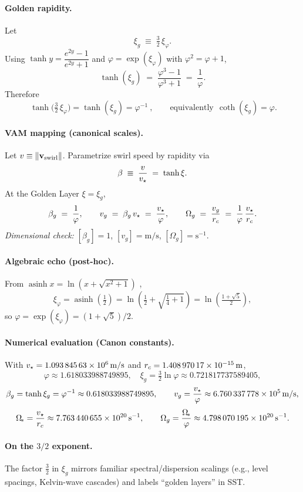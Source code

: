\paragraph*{Golden rapidity.}
Let
\[
	\xi_g \;\equiv\; \tfrac{3}{2}\,\xi_\varphi.
\]
Using \(\tanh y=\dfrac{e^{2y}-1}{e^{2y}+1}\) \cite{NISTDLMF} and \(\varphi=\exp(\xi_\varphi)\) with \(\varphi^2=\varphi+1\),
\[
	\tanh(\xi_g) \;=\; \frac{\varphi^3-1}{\varphi^3+1}
	\;=\; \frac{1}{\varphi}.
\]
Therefore
\[
	\boxed{\ \tanh\!\big(\tfrac{3}{2}\,\xi_\varphi\big)=\tanh(\xi_g)=\varphi^{-1}\ },
	\qquad\text{equivalently}\ \ \coth(\xi_g)=\varphi.
\]

\paragraph*{VAM mapping (canonical scales).}
Let \(v\equiv\|\mathbf{v}_{\mathrm{swirl}}\|\). Parametrize swirl speed by rapidity via
\[
	\beta \;\equiv\; \frac{v}{v_\star} \;=\; \tanh\xi.
\]
At the Golden Layer \(\xi=\xi_g\),
\[
	\beta_g \;=\; \frac{1}{\varphi},\qquad
	v_g \;=\; \beta_g\,v_\star \;=\; \frac{v_\star}{\varphi},\qquad
	\Omega_g \;=\; \frac{v_g}{r_c} \;=\; \frac{1}{\varphi}\,\frac{v_\star}{r_c}.
\]
\emph{Dimensional check:} \([\beta_g]=1\), \([v_g]=\mathrm{m/s}\), \([\Omega_g]=\mathrm{s}^{-1}\).

\paragraph*{Algebraic echo (post-hoc).}
From \(\operatorname{asinh}x=\ln(x+\sqrt{x^2+1})\) \cite{NISTDLMF},
\[
	\xi_\varphi=\operatorname{asinh}\!\left(\tfrac{1}{2}\right)
	=\ln\!\left(\tfrac{1}{2}+\sqrt{\tfrac{1}{4}+1}\right)
	=\ln\!\left(\tfrac{1+\sqrt5}{2}\right),
\]
so \(\varphi=\exp(\xi_\varphi)=(1+\sqrt5)/2\).

\paragraph*{Numerical evaluation (Canon constants).}
With \(v_\star=\SI{1.09384563e6}{m/s}\) and \(r_c=\SI{1.40897017e-15}{m}\),
\[
	\varphi \approx 1.618033988749895,\quad
	\xi_g=\tfrac{3}{2}\ln\varphi \approx 0.721817737589405,
\]
\[
	\beta_g=\tanh\xi_g=\varphi^{-1}\approx 0.618033988749895,\qquad
	v_g=\frac{v_\star}{\varphi}\approx \SI{6.760337778e5}{m/s},
\]
\[
	\Omega_{\!*}=\frac{v_\star}{r_c}\approx \SI{7.763440655e20}{s^{-1}},\qquad
	\Omega_g=\frac{\Omega_{\!*}}{\varphi}\approx \SI{4.798070195e20}{s^{-1}}.
\]

\paragraph*{On the \(3/2\) exponent.}
The factor \(\tfrac{3}{2}\) in \(\xi_g\) mirrors familiar spectral/dispersion scalings (e.g., level spacings, Kelvin-wave cascades) and labels “golden layers” in SST.

